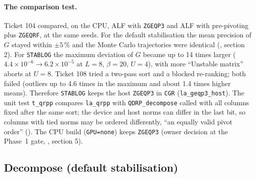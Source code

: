 \paragraph{The comparison test.} Ticket 104 compared, on the CPU, ALF with \texttt{ZGEQP3} and ALF with pre-pivoting plus \texttt{ZGEQRF}, at the same seeds. For the default stabilisation the mean precision of $G$ stayed within $\pm5\,\%$ and the Monte Carlo trajectories were identical (, section 2). For \texttt{STABLOG} the maximum deviation of $G$ became up to 14 times larger ($4.4\times10^{-6}\to6.2\times10^{-5}$ at $L=8$, $\beta=20$, $U=4$), with more ``Unstable matrix'' aborts at $U=8$. Ticket 108 tried a two-pass sort and a blocked re-ranking; both failed (outliers up to 4.6 times in the maximum and about 1.4 times higher means). Therefore \texttt{STABLOG} keeps the host \texttt{ZGEQP3} in \texttt{CGR} (\texttt{la\_geqp3\_host}). %
The unit test \texttt{t\_qrpp} compares \texttt{la\_qrpp} with \texttt{QDRP\_decompose} called with all columns fixed after the same sort; the device and host norms can differ in the last bit, so columns with tied norms may be ordered differently, ``an equally valid pivot order'' (). The CPU build (\texttt{GPU=none}) keeps \texttt{ZGEQP3} (owner decision at the Phase~1 gate, , section 5).

\subsection{Decompose (default stabilisation)}

